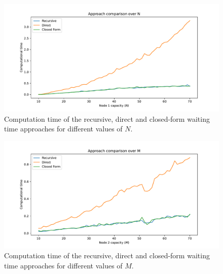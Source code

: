 \begin{figure}[H]
    \includegraphics[width=\textwidth]{chapters/03_queueing_model/Bin/numeric_results_and_timings/waiting_time_formulas_comparison/algorithm_duration_over_N.pdf}
    \caption{Computation time of the recursive, direct and closed-form waiting
    time approaches for different values of \(N\).}
    \label{fig:waiting_time_algorithm_duration_over_N}
\end{figure}

\begin{figure}[H]
    \includegraphics[width=\textwidth]{chapters/03_queueing_model/Bin/numeric_results_and_timings/waiting_time_formulas_comparison/algorithm_duration_over_M.pdf}
    \caption{Computation time of the recursive, direct and closed-form waiting
    time approaches for different values of \(M\).}
    \label{fig:waiting_time_algorithm_duration_over_M}
\end{figure}


